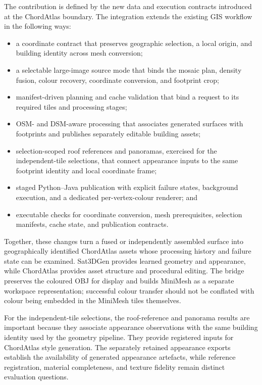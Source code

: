 The contribution is defined by the new data and execution contracts introduced
at the ChordAtlas boundary.  The integration extends the existing GIS workflow
in the following ways:

\begin{itemize}
  \item a coordinate contract that preserves geographic selection, a local
  origin, and building identity across mesh conversion;
  \item a selectable large-image source mode that binds the mosaic plan,
  density fusion, colour recovery, coordinate conversion, and footprint crop;
  \item manifest-driven planning and cache validation that bind a request to
  its required tiles and processing stages;
  \item OSM- and DSM-aware processing that associates generated surfaces with
  footprints and publishes separately editable building assets;
  \item selection-scoped roof references and panoramas, exercised for the
  independent-tile selections, that connect appearance inputs to the same
  footprint identity and local coordinate frame;
  \item staged Python--Java publication with explicit failure states,
  background execution, and a dedicated per-vertex-colour renderer; and
  \item executable checks for coordinate conversion, mesh prerequisites,
  selection manifests, cache state, and publication contracts.
\end{itemize}

Together, these changes turn a fused or independently assembled surface into
geographically identified ChordAtlas assets whose processing history and
failure state can be examined.  Sat3DGen provides learned geometry and
appearance, while ChordAtlas provides asset structure and procedural editing.
The bridge preserves the coloured OBJ for display and builds MiniMesh as a
separate workspace representation; successful colour transfer should not be
conflated with colour being embedded in the MiniMesh tiles themselves.

For the independent-tile selections, the roof-reference and panorama results
are important because they associate
appearance observations with the same building identity used by the geometry
pipeline.  They provide registered inputs for ChordAtlas style generation.
The separately retained appearance exports establish the availability of
generated appearance artefacts, while reference registration, material
completeness, and texture fidelity
remain distinct evaluation questions.

